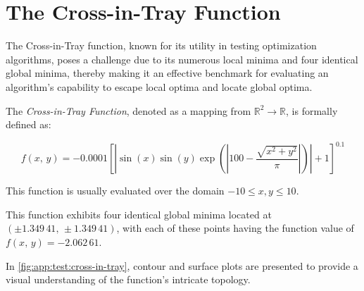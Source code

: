 \section{The Cross-in-Tray Function}
\label{sec:app:test:cross-in-tray}
  The Cross-in-Tray function, known for its utility in testing optimization 
  algorithms, poses a challenge due to its numerous local minima and four 
  identical global minima, thereby making it an effective benchmark for 
  evaluating an algorithm's capability to escape local optima and locate global 
  optima.

  \begin{definition}
  The \emph{Cross-in-Tray Function}, denoted as a mapping from \(\mathbb{R}^2 
  \to \mathbb{R}\), is formally defined as:

  \begin{equation}
    f(x,\, y) = 
      -0.0001 \left[ 
        \left|
          \sin(x) \sin(y) \exp \left( 
            \left| 100 - \frac{\sqrt{x^2 + y^2}}{\pi} \right| 
          \right) 
        \right| + 1 
      \right] ^{0.1}
  \end{equation}

  This function is usually evaluated over the domain \(-10 \leq x, y \leq 10\).
  \end{definition}

  This function exhibits four identical global minima located at 
  \((\pm 1.349\,41,\, \pm 1.349\,41)\), with each of these points having the 
  function value of \(f(x,\, y) = -2.062\,61\).

  In \vref{fig:app:test:cross-in-tray}, contour and surface plots are presented 
  to provide a visual understanding of the function's intricate topology.

